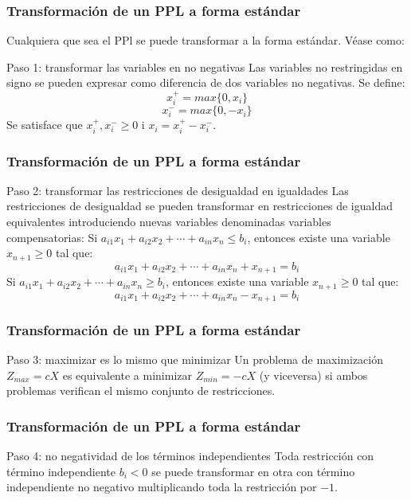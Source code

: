 \documentclass{beamer}
\begin{document}
\begin{frame}
\frametitle{Transformaci\'on de un PPL a forma est\'andar}
Cualquiera que sea el PPl se puede transformar a la forma est\'andar. V\'ease como:
\begin{block}{Paso 1: transformar las variables en no negativas}
Las variables no restringidas en signo se pueden expresar como diferencia de dos variables no negativas. Se define:
\[x_i^{+} = max\{0,x_i\}\]
\[x_i^{-} = max\{0,-x_i\}\]
Se satisface que $x_i^{+}, x_i^{-}\geq 0$ i $x_i = x_i^{+}-x_i^{-}$.
\end{block}
\end{frame}



\begin{frame}
\frametitle{Transformaci\'on de un PPL a forma est\'andar}
\begin{block}{Paso 2: transformar las restricciones de desigualdad en igualdades}
Las restricciones de desigualdad se pueden transformar en restricciones de igualdad equivalentes introduciendo nuevas variables denominadas variables compensatorias:
Si $a_{i1}x_1+a_{i2}x_2+\cdots+a_{in}x_n\leq b_i$, entonces existe una variable $x_{n+1}\geq 0$ tal que:
\[a_{i1}x_1+a_{i2}x_2+\cdots+a_{in}x_n+x_{n+1} = b_i\]
Si $a_{i1}x_1+a_{i2}x_2+\cdots+a_{in}x_n\geq b_i$, entonces existe una variable $x_{n+1}\geq 0$ tal que:
\[a_{i1}x_1+a_{i2}x_2+\cdots+a_{in}x_n-x_{n+1} = b_i\]
\end{block}
\end{frame}




\begin{frame}
\frametitle{Transformaci\'on de un PPL a forma est\'andar}
\begin{block}{Paso 3: maximizar es lo mismo que minimizar}
Un problema de maximizaci\'on $Z_{max} = cX$ es equivalente a minimizar $Z_{min} = -cX$ (y viceversa) si ambos problemas verifican el mismo conjunto de restricciones.
\end{block}
\end{frame}

\begin{frame}
\frametitle{Transformaci\'on de un PPL a forma est\'andar}
\begin{block}{Paso 4: no negatividad de los t\'erminos independientes}
Toda restricci\'on con t\'ermino independiente $b_i<0$ se puede transformar en otra con t\'ermino independiente no negativo multiplicando toda la restricci\'on por $-1$.
\end{block}
\end{frame}
\end{document}

